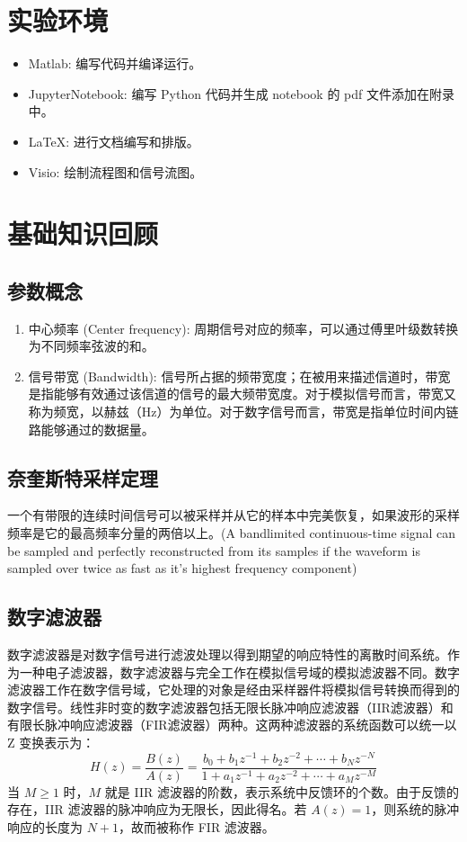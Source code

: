 \documentclass[12pt,AutoFakeBold]{article}
\begin{document}
\section{实验环境}

\begin{itemize}
\item Matlab: 编写代码并编译运行。
\item JupyterNotebook: 编写 Python 代码并生成 notebook 的 pdf 文件添加在附录中。
\item \LaTeX: 进行文档编写和排版。
\item Visio: 绘制流程图和信号流图。
\end{itemize}

\section{基础知识回顾}

\subsection{参数概念}

\begin{enumerate}[1.]
\item 中心频率 (Center frequency): 周期信号对应的频率，可以通过傅里叶级数转换为不同频率弦波的和。
\item 信号带宽 (Bandwidth): 信号所占据的频带宽度；在被用来描述信道时，带宽是指能够有效通过该信道的信号的最大频带宽度。对于模拟信号而言，带宽又称为频宽，以赫兹（Hz）为单位。对于数字信号而言，带宽是指单位时间内链路能够通过的数据量。
\end{enumerate}

\subsection{奈奎斯特采样定理}

一个有带限的连续时间信号可以被采样并从它的样本中完美恢复，如果波形的采样频率是它的最高频率分量的两倍以上。(A bandlimited continuous-time signal can be sampled and perfectly reconstructed from its samples if the waveform is sampled over twice as fast as it's highest frequency component)

\subsection{数字滤波器}

数字滤波器是对数字信号进行滤波处理以得到期望的响应特性的离散时间系统。作为一种电子滤波器，数字滤波器与完全工作在模拟信号域的模拟滤波器不同。数字滤波器工作在数字信号域，它处理的对象是经由采样器件将模拟信号转换而得到的数字信号。线性非时变的数字滤波器包括无限长脉冲响应滤波器（IIR滤波器）和有限长脉冲响应滤波器（FIR滤波器）两种。这两种滤波器的系统函数可以统一以 Z 变换表示为：
%
\begin{equation}
H(z)=\frac{B(z)}{A(z)}=\frac{b_0+b_1z^{-1}+b_2z^{-2}+\cdots+b_Nz^{-N}}{1+a_1z^{-1}+a_2z^{-2}+\cdots+a_Mz^{-M}}
\end{equation}
%
当 $M\ge1$ 时，$M$ 就是 IIR 滤波器的阶数，表示系统中反馈环的个数。由于反馈的存在，IIR 滤波器的脉冲响应为无限长，因此得名。若 $A(z)=1$，则系统的脉冲响应的长度为 $N+1$，故而被称作 FIR 滤波器。
\end{document}
